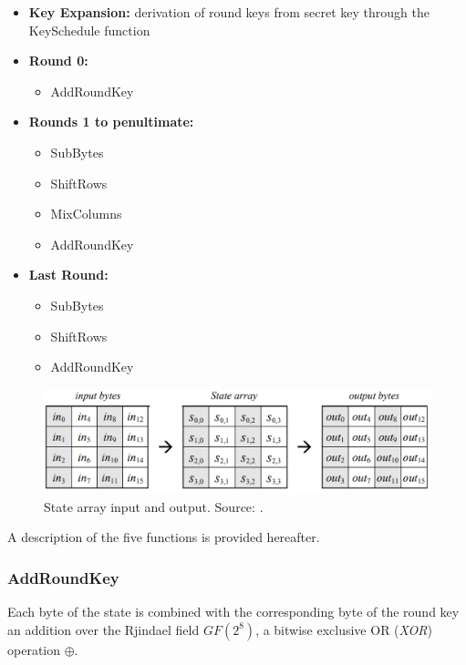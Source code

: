 \begin{itemize}
\item[]\textbf{Key Expansion:}  derivation of round keys from secret key through the KeySchedule function
\item[]\textbf{Round 0:}  
\begin{itemize}
\item[] AddRoundKey
\end{itemize}
\item[] \textbf{Rounds 1 to penultimate:}
\begin{itemize}
\item[] SubBytes
\item[] ShiftRows
\item[] MixColumns
\item[] AddRoundKey
\end{itemize}
\item[] \textbf{Last Round:}
\begin{itemize}
\item[] SubBytes
\item[] ShiftRows
\item[] AddRoundKey
\end{itemize}
\end{itemize}

\begin{figure}
\includegraphics[width = \textwidth]{../Figures/FISP_AES/state.png} 
\caption[State array input and output.]{State array input and output. Source: \cite{nist197}.}\label{fig:AES_state}
\end{figure}

A description of the five functions is provided hereafter.


\subsubsection*{AddRoundKey} Each byte of the state is combined with the corresponding byte of the round key \via an addition over the Rjindael field $GF(2^8)$, \ie a bitwise exclusive OR (\emph{XOR}) operation $\oplus$.
